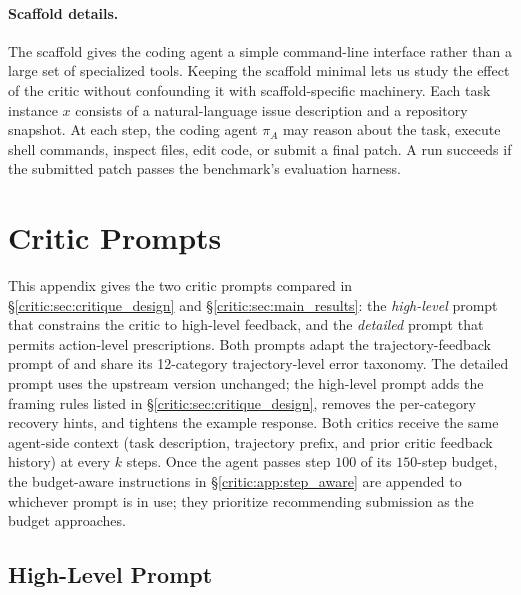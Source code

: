 \paragraph{Scaffold details.} The scaffold gives the coding agent a simple command-line interface rather than a large set of specialized tools. Keeping the scaffold minimal lets us study the effect of the critic without confounding it with scaffold-specific machinery. Each task instance $x$ consists of a natural-language issue description and a repository snapshot. At each step, the coding agent $\pi_A$ may reason about the task, execute shell commands, inspect files, edit code, or submit a final patch. A run succeeds if the submitted patch passes the benchmark's evaluation harness.

\section{Critic Prompts}
\label{critic:app:critic_prompts}

This appendix gives the two critic prompts compared in §\ref{critic:sec:critique_design} and §\ref{critic:sec:main_results}: the \emph{high-level} prompt that constrains the critic to high-level feedback, and the \emph{detailed} prompt that permits action-level prescriptions. Both prompts adapt the trajectory-feedback prompt of \citet{gandhi2025sweprm} and share its 12-category trajectory-level error taxonomy. The detailed prompt uses the upstream version unchanged; the high-level prompt adds the framing rules listed in §\ref{critic:sec:critique_design}, removes the per-category recovery hints, and tightens the example response. Both critics receive the same agent-side context (task description, trajectory prefix, and prior critic feedback history) at every $k$ steps. Once the agent passes step $100$ of its $150$-step budget, the budget-aware instructions in §\ref{critic:app:step_aware} are appended to whichever prompt is in use; they prioritize recommending submission as the budget approaches.

\subsection{High-Level Prompt}
\label{critic:app:high_level_prompt}

